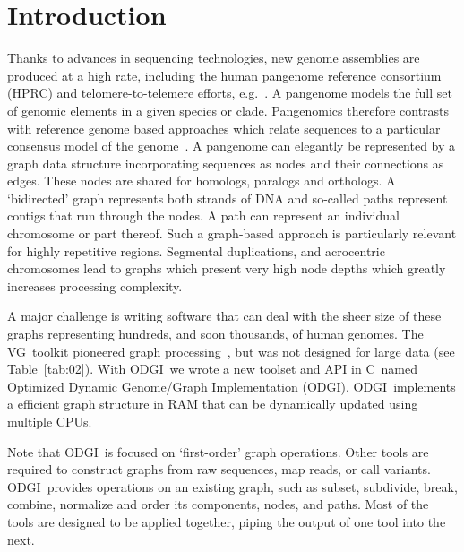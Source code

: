 \documentclass{bioinfo}
\newcommand{\odgi}{ODGI}
\newcommand{\vg}{VG}
\newcommand{\Rplus}{\protect\hspace{-.1em}\protect\raisebox{.35ex}{\smaller{\smaller\textbf{+}}}}
\newcommand{\Cpp}{\mbox{C\Rplus\Rplus}\xspace}
\begin{document}
    \maketitle

    

    \section{Introduction}

    Thanks to advances in sequencing technologies, new genome
    assemblies are produced at a high rate, including the human
    pangenome reference consortium (HPRC) and telomere-to-telemere
    efforts, e.g.~\citep{Miga:2020}.  A pangenome models the full set
    of genomic elements in a given species or clade. Pangenomics
    therefore contrasts with reference genome based approaches which
    relate sequences to a particular consensus model of the
    genome~\citep{Eizenga:2020}. A pangenome can elegantly be
    represented by a graph data structure incorporating sequences as
    nodes and their connections as edges. These nodes are shared for
    homologs, paralogs and orthologs.  A `bidirected' graph represents
    both strands of DNA and so-called paths represent contigs that run
    through the nodes. A path can represent an individual chromosome
    or part thereof. Such a graph-based approach is particularly
    relevant for highly repetitive regions. Segmental duplications,
    and acrocentric chromosomes lead to graphs which present very high
    node depths which greatly increases processing complexity.

    A major challenge is writing software that can deal with the sheer
    size of these graphs representing hundreds, and soon thousands, of
    human genomes. The \vg\ toolkit pioneered graph
    processing~\citep{vgtools,Eizenga:2020b}, but was not designed for
    large data (see Table~\ref{tab:02}). With \odgi\ we
    wrote a new toolset and API in \Cpp\ named Optimized Dynamic
    Genome/Graph Implementation (ODGI). \odgi\ implements a efficient
    graph structure in RAM that can be dynamically updated using
    multiple CPUs.

    Note that \odgi\ is focused on `first-order' graph
    operations.  Other tools are required to construct graphs from raw
    sequences, map reads, or call variants.  \odgi\ provides
    operations on an existing graph, such as subset, subdivide, break,
    combine, normalize and order its components, nodes, and
    paths. Most of the tools are designed to be applied together,
    piping the output of one tool into the next.
\end{document}
